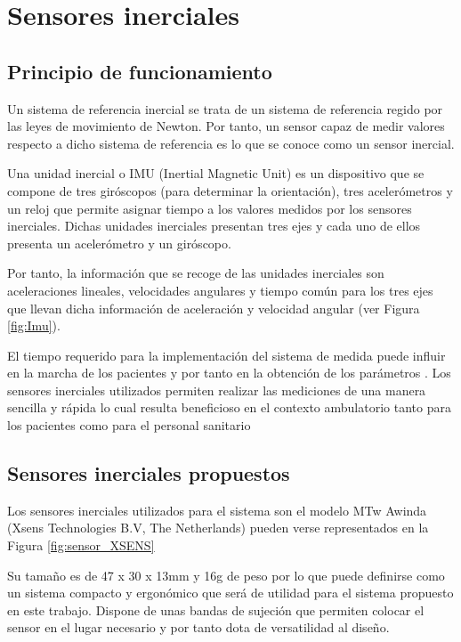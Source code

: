 \section{Sensores inerciales}
\subsection{Principio de funcionamiento}

Un sistema de referencia inercial se trata de un sistema de referencia regido por las leyes de movimiento de Newton. Por tanto, un sensor capaz de medir valores respecto a dicho sistema de referencia es lo que se conoce como un sensor inercial.

Una unidad inercial o IMU (Inertial Magnetic Unit) es un dispositivo que se compone de tres giróscopos (para determinar la orientación), tres acelerómetros y un reloj que permite asignar tiempo a los valores medidos por los sensores inerciales. Dichas unidades inerciales presentan tres ejes y cada uno de ellos presenta un acelerómetro y un giróscopo.

Por tanto, la información que se recoge de las unidades inerciales son aceleraciones lineales, velocidades angulares y tiempo común para los tres ejes que llevan dicha información de aceleración y velocidad angular (ver Figura \ref{fig:Imu}). 


El tiempo requerido para la implementación del sistema de medida puede influir en la marcha de los pacientes y por tanto en la obtención de los parámetros \cite{begona}. Los sensores inerciales utilizados permiten realizar las mediciones de una manera sencilla y rápida lo cual resulta beneficioso en el contexto ambulatorio tanto para los pacientes como para el personal sanitario



\subsection{Sensores inerciales propuestos}
Los sensores inerciales utilizados para el sistema son el modelo MTw Awinda (Xsens Technologies B.V, The Netherlands) pueden verse representados en la Figura \ref{fig:sensor_XSENS}



Su tamaño es de 47 x 30 x 13mm y 16g de peso por lo que puede definirse como un sistema compacto y ergonómico que será de utilidad para el sistema propuesto en este trabajo. Dispone de unas bandas de sujeción que permiten colocar el sensor en el lugar necesario y por tanto dota de versatilidad al diseño. 

